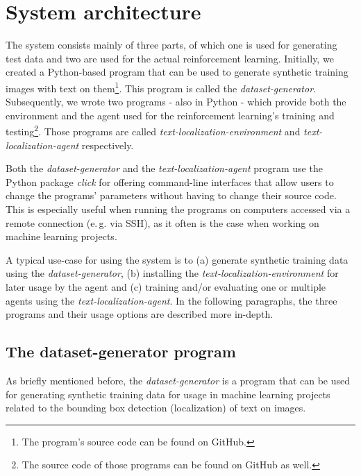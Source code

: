 \section{System architecture}

The system consists mainly of three parts, of which one is used for generating test data and two are used for the actual reinforcement learning.
Initially, we created a Python-based program that can be used to generate synthetic training images with text on them\footnote{The program's source code can be found on GitHub.\cite{GitHubDatasetGenerator}}.
This program is called the \textit{dataset-generator}.
Subsequently, we wrote two programs - also in Python - which provide both the environment and the agent used for the reinforcement learning's training and testing\footnote{The source code of those programs can be found on GitHub as well.\cite{GitHubTextLocalizationEnvironment}\cite{GitHubTextLocalizationAgent}}. 
Those programs are called \textit{text-localization-environment} and \textit{text-localization-agent} respectively. 

Both the \textit{dataset-generator} and the \textit{text-localization-agent} program use the Python package \textit{click}\cite{PythonPackageClick} for offering command-line interfaces that allow users to change the programs' parameters without having to change their source code.
This is especially useful when running the programs on computers accessed via a remote connection (e.\,g. via SSH), as it often is the case when working on machine learning projects.

A typical use-case for using the system is to (a) generate synthetic training data using the \textit{dataset-generator}, (b) installing the \textit{text-localization-environment} for later usage by the agent and (c) training and/or evaluating one or multiple agents using the \textit{text-localization-agent}. 
In the following paragraphs, the three programs and their usage options are described more in-depth.

\subsection{The dataset-generator program}\label{sec:dataset-generator}

As briefly mentioned before, the \textit{dataset-generator} is a program that can be used for generating synthetic training data for usage in machine learning projects related to the bounding box detection (localization) of text on images.

